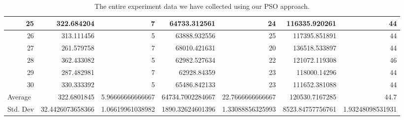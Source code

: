 \begin{table}
\begin{adjustwidth}{}{}
{{\begin{tabular}{|r|r|r|r|r|r|r|}
	\hline
	25                                         & 322.684204                   & 7                                     & 64733.312561                   & 24                                    & 116335.920261                & 44                                     \\ 
	\hline
	26                                         & 313.111456                   & 5                                     & 63888.932556                   & 25                                    & 117395.851891                & 44                                     \\ 
	\hline
	27                                         & 261.579758                   & 7                                     & 68010.421631                   & 20                                    & 136518.533897                & 44                                     \\ 
	\hline
	28                                         & 362.433082                   & 5                                     & 62982.527634                   & 22                                    & 121072.119308                & 46                                     \\ 
	\hline
	29                                         & 287.482981                   & 7                                     & 62928.84359                    & 23                                    & 118000.14296                 & 44                                     \\ 
	\hline
	30                                         & 330.333392                   & 5                                     & 65486.842133                   & 23                                    & 111652.381088                & 44                                     \\ 
	\hline
	\multicolumn{1}{|l|}{Average}              & 322.6801845                  & 5.96666666666667                      & 64734.7002284667               & 22.7666666666667                      & 120530.7167285               & 44.7                                   \\ 
	\hline
	\multicolumn{1}{|l|}{Std. Dev}             & 32.4426073658366             & 1.06619961038982                      & 1890.32624601396               & 1.33088856325993                      & 8523.84757756761             & 1.93248098531931                       \\
	\hline
\end{tabular}}}
\end{adjustwidth}
\caption{The entire experiment data we have collected using our PSO approach.}
\label{full-data-pso}
\end{table}

